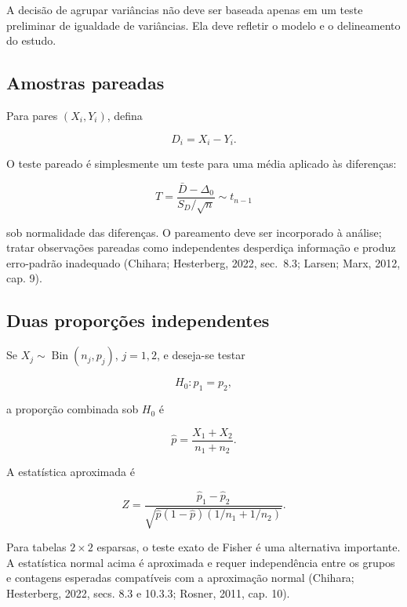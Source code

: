 \documentclass[
  letterpaper,
  DIV=11,
  numbers=noendperiod]{scrreprt}
\begin{document}
\begin{tcolorbox}[enhanced jigsaw, colback=white, leftrule=.75mm, colbacktitle=quarto-callout-warning-color!10!white, breakable, titlerule=0mm, bottomtitle=1mm, title=\textcolor{quarto-callout-warning-color}{\faExclamationTriangle}\hspace{0.5em}{Observação}, colframe=quarto-callout-warning-color-frame, toprule=.15mm, opacityback=0, bottomrule=.15mm, opacitybacktitle=0.6, arc=.35mm, toptitle=1mm, rightrule=.15mm, coltitle=black, left=2mm]

A decisão de agrupar variâncias não deve ser baseada apenas em um teste
preliminar de igualdade de variâncias. Ela deve refletir o modelo e o
delineamento do estudo.

\end{tcolorbox}

\subsection{Amostras pareadas}\label{amostras-pareadas}

Para pares \((X_i,Y_i)\), defina

\[D_i=X_i-Y_i.\]

O teste pareado é simplesmente um teste para uma média aplicado às
diferenças:

\[T
=
\frac{\bar{D}-\Delta_0}{S_D/\sqrt{n}}
\sim t_{n-1}\]

sob normalidade das diferenças. O pareamento deve ser incorporado à
análise; tratar observações pareadas como independentes desperdiça
informação e produz erro-padrão inadequado (Chihara; Hesterberg, 2022,
sec.~8.3; Larsen; Marx, 2012, cap. 9).

\subsection{Duas proporções
independentes}\label{duas-proporuxe7uxf5es-independentes}

Se \(X_j\sim\operatorname{Bin}(n_j,p_j)\), \(j=1,2\), e deseja-se testar

\[H_0:p_1=p_2,\]

a proporção combinada sob \(H_0\) é

\[\widehat p
=
\frac{X_1+X_2}{n_1+n_2}.\]

A estatística aproximada é

\[Z
=
\frac{\widehat p_1-\widehat p_2}
{\sqrt{\widehat p(1-\widehat p)(1/n_1+1/n_2)}}.\]

Para tabelas \(2\times2\) esparsas, o teste exato de Fisher é uma
alternativa importante. A estatística normal acima é aproximada e requer
independência entre os grupos e contagens esperadas compatíveis com a
aproximação normal (Chihara; Hesterberg, 2022, secs. 8.3 e 10.3.3;
Rosner, 2011, cap. 10).
\end{document}
